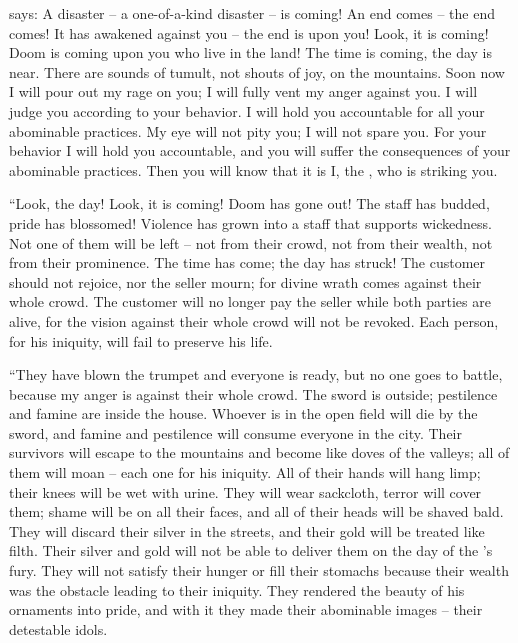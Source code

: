 {{}
says: A disaster –
a one-of-a-kind
disaster
– is
coming!
An end
comes –
the end comes! It has awakened
against you – the end is upon you! Look, it is coming!
Doom
is coming
upon you who live
in the land! The time
is coming,
the day
is near.
There are sounds of tumult,
not
shouts
of joy, on the mountains.
Soon
now I will pour
out my rage
on
you; I will fully vent
my anger
against you. I will judge
you according to your behavior.
I will
hold you accountable
for all
your abominable practices.
My eye will not
pity
you; I will not
spare
you. For your behavior
I will
hold you accountable,
and you will suffer the consequences
of your abominable
practices. Then you will
know
that
it is I,
the {},
who is striking you.
\par }{\PP {}“Look,
the day! Look,
it is coming! Doom
has gone out! The staff
has budded,
pride
has blossomed!
Violence
has grown into
a staff
that supports wickedness.
Not
one of them will be left – not from their crowd, not from their wealth, not from their prominence.
The time
has come;
the day
has struck! The customer
should not
rejoice,
nor
the seller
mourn;
for
divine wrath
comes against
their whole
crowd.
The customer will no longer
pay
the seller
while
both
parties are alive,
for
the vision
against
their whole
crowd
will not
be revoked.
Each person,
for his iniquity,
will fail
to preserve
his life.
\par }{\PP {}“They have blown
the trumpet
and everyone
is ready,
but no
one goes
to battle,
because
my anger
is against their whole
crowd.
The sword
is outside;
pestilence
and famine
are inside the house.
Whoever
is in the open field
will die
by the sword,
and famine
and pestilence
will consume
everyone in the city.
Their survivors
will escape
to
the mountains
and become like doves
of the valleys;
all
of them will moan
– each
one for his iniquity.
All
of their hands
will hang limp;
their knees
will be wet with urine.
They will wear sackcloth,
terror
will cover
them; shame
will be on all
their faces,
and all
of their heads
will be shaved bald.
They will discard
their silver
in the streets,
and their gold
will be
treated like filth.
Their silver
and gold
will not
be able
to deliver
them on the day
of the
{}’s
fury.
They will not satisfy
their hunger
or
fill
their stomachs
because
their wealth was the obstacle
leading to their iniquity.
They rendered
the beauty
of his ornaments
into pride,
and with it they made
their abominable
images
– their detestable idols.
}
